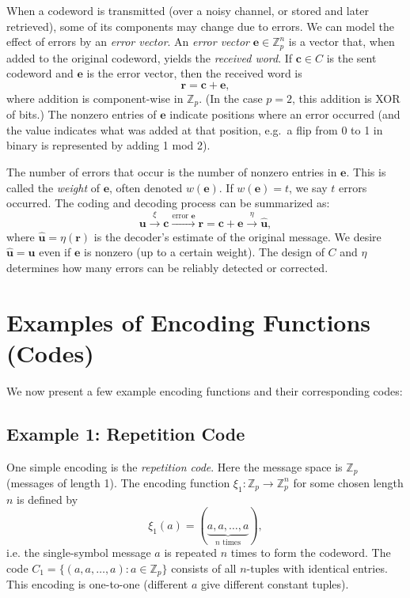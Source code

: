 \documentclass[docmute]{article}
\begin{document}
When a codeword is transmitted (over a noisy channel, or stored and later retrieved), some of its components may change due to errors. We can model the effect of errors by an \emph{error vector}. An \emph{error vector} \(\mathbf{e} \in \mathbb{Z}_p^n\) is a vector that, when added to the original codeword, yields the \emph{received word}. If \(\mathbf{c} \in C\) is the sent codeword and \(\mathbf{e}\) is the error vector, then the received word is
\[
  \mathbf{r} = \mathbf{c} + \mathbf{e},
\]
where addition is component-wise in \(\mathbb{Z}_p\). (In the case \(p=2\), this addition is XOR of bits.) The nonzero entries of \(\mathbf{e}\) indicate positions where an error occurred (and the value indicates what was added at that position, e.g.\ a flip from 0 to 1 in binary is represented by adding 1 mod 2).

The number of errors that occur is the number of nonzero entries in \(\mathbf{e}\). This is called the \emph{weight} of \(\mathbf{e}\), often denoted \(w(\mathbf{e})\). If \(w(\mathbf{e}) = t\), we say \(t\) errors occurred. The coding and decoding process can be summarized as:
\[
  \mathbf{u} \xrightarrow{\xi} \mathbf{c}
            \xrightarrow{\text{error }\mathbf{e}}
            \mathbf{r} = \mathbf{c} + \mathbf{e}
            \xrightarrow{\eta} \hat{\mathbf{u}},
\]
where \(\hat{\mathbf{u}} = \eta(\mathbf{r})\) is the decoder’s estimate of the original message. We desire \(\hat{\mathbf{u}} = \mathbf{u}\) even if \(\mathbf{e}\) is nonzero (up to a certain weight). The design of \(C\) and \(\eta\) determines how many errors can be reliably detected or corrected.


\section{Examples of Encoding Functions (Codes)}

We now present a few example encoding functions and their corresponding codes:

\subsection*{Example 1: Repetition Code}
One simple encoding is the \emph{repetition code}. Here the message space is $\mathbb{Z}_p$ (messages of length 1). The encoding function $\xi_1: \mathbb{Z}_p \to \mathbb{Z}_p^n$ for some chosen length $n$ is defined by 
\[ \xi_1(a) = (\underbrace{a, a, \ldots, a}_{n \text{ times}}), \] 
i.e. the single-symbol message $a$ is repeated $n$ times to form the codeword. The code $C_1 = \{(a,a,\ldots,a) : a \in \mathbb{Z}_p\}$ consists of all $n$-tuples with identical entries. This encoding is one-to-one (different $a$ give different constant tuples).
\end{document}
